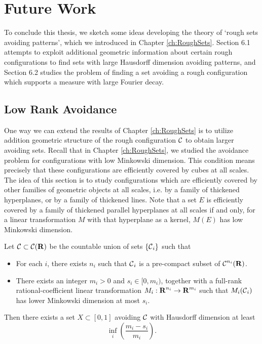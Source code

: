
\chapter{Future Work}
\label{ch:Conclusions}

To conclude this thesis, we sketch some ideas developing the theory of `rough sets avoiding patterns', which we introduced in Chapter \ref{ch:RoughSets}. Section 6.1 attempts to exploit additional geometric information about certain rough configurations to find sets with large Hausdorff dimension avoiding patterns, and Section 6.2 studies the problem of finding a set avoiding a rough configuration which supports a measure with large Fourier decay.

\section{Low Rank Avoidance}

One way we can extend the results of Chapter \ref{ch:RoughSets} is to utilize addition geometric structure of the rough configuration $\operatorname{\mathcal{C}}$ to obtain larger avoiding sets. Recall that in Chapter \ref{ch:RoughSets}, we studied the avoidance problem for configurations with low Minkowski dimension. This condition means precisely that these configurations are efficiently covered by cubes at all scales. The idea of this section is to study configurations which are efficiently covered by other families of geometric objects at all scales, i.e. by a family of thickened hyperplanes, or by a family of thickened lines. Note that a set $E$ is efficiently covered by a family of thickened parallel hyperplanes at all scales if and only, for a linear transformation $M$ with that hyperplane as a kernel, $M(E)$ has low Minkowski dimension.

\begin{theorem} \label{theorem9063909014901}
    Let $\operatorname{\mathcal{C}} \subset \operatorname{\mathcal{C}}(\operatorname{\mathbf{R}})$ be the countable union of sets $\{ \operatorname{\mathcal{C}}_i \}$ such that
    \begin{itemize}
        \item For each $i$, there exists $n_i$ such that $\operatorname{\mathcal{C}}_i$ is a pre-compact subset of $\operatorname{\mathcal{C}}^{n_i}(\operatorname{\mathbf{R}})$.

        \item There exists an integer $m_i > 0$ and $s_i \in [0,m_i)$, together with a full-rank rational-coefficient linear transformation $M_i: \operatorname{\mathbf{R}}^{n_i} \to \operatorname{\mathbf{R}}^{m_i}$ such that $M_i(\operatorname{\mathcal{C}}_i)$ has lower Minkowski dimension at most $s_i$.
    \end{itemize}
    Then there exists a set $X \subset [0,1]$ avoiding $\operatorname{\mathcal{C}}$ with Hausdorff dimension at least
    \[ \inf_i \left( \frac{m_i - s_i}{m_i} \right). \]
\end{theorem}

